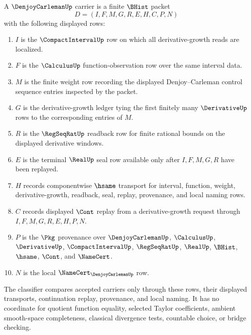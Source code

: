 \begin{definition}
\label{def:denjoy-carleman-carrier}
A $\DenjoyCarlemanUp$ carrier is a finite $\BHist$ packet
$$
D=(I,F,M,G,R,E,H,C,P,N)
$$
with the following displayed rows:
\begin{enumerate}
\item $I$ is the $\CompactIntervalUp$ row on which all derivative-growth reads are localized.
\item $F$ is the $\CalculusUp$ function-observation row over the same interval data.
\item $M$ is the finite weight row recording the displayed Denjoy--Carleman control sequence entries inspected by the packet.
\item $G$ is the derivative-growth ledger tying the first finitely many $\DerivativeUp$ rows to the corresponding entries of $M$.
\item $R$ is the $\RegSeqRatUp$ readback row for finite rational bounds on the displayed derivative windows.
\item $E$ is the terminal $\RealUp$ seal row available only after $I,F,M,G,R$ have been replayed.
\item $H$ records componentwise $\hsame$ transport for interval, function, weight, derivative-growth, readback, seal, replay, provenance, and local naming rows.
\item $C$ records displayed $\Cont$ replay from a derivative-growth request through $I,F,M,G,R,E,H,P,N$.
\item $P$ is the $\Pkg$ provenance over $\DenjoyCarlemanUp$, $\CalculusUp$, $\DerivativeUp$, $\CompactIntervalUp$, $\RegSeqRatUp$, $\RealUp$, $\BHist$, $\hsame$, $\Cont$, and $\NameCert$.
\item $N$ is the local $\NameCert_{\DenjoyCarlemanUp}$ row.
\end{enumerate}
The classifier compares accepted carriers only through these rows, their displayed transports, continuation replay, provenance, and local naming. It has no coordinate for quotient function equality, selected Taylor coefficients, ambient smooth-space completeness, classical divergence tests, countable choice, or bridge checking.
\end{definition}

